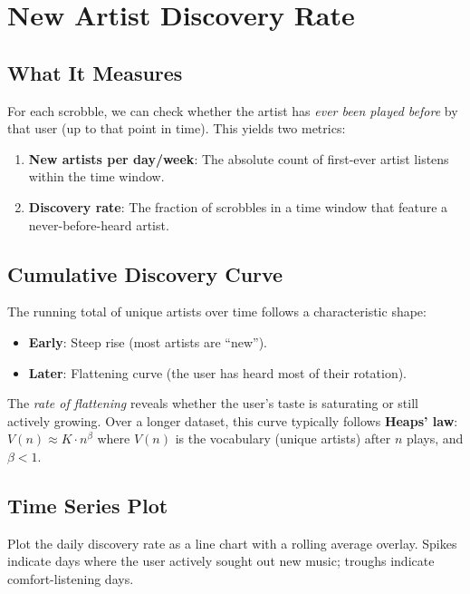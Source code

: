 \documentclass[12pt, a4paper]{article}
\begin{document}
\section{New Artist Discovery Rate}

\subsection{What It Measures}

For each scrobble, we can check whether the artist has \emph{ever been
played before} by that user (up to that point in time). This yields two
metrics:

\begin{enumerate}
    \item \textbf{New artists per day/week}: The absolute count of
          first-ever artist listens within the time window.
    \item \textbf{Discovery rate}: The fraction of scrobbles in a time
          window that feature a never-before-heard artist.
\end{enumerate}

\subsection{Cumulative Discovery Curve}

The running total of unique artists over time follows a characteristic shape:
\begin{itemize}
    \item \textbf{Early}: Steep rise (most artists are ``new'').
    \item \textbf{Later}: Flattening curve (the user has heard most of their
          rotation).
\end{itemize}

The \emph{rate of flattening} reveals whether the user's taste is saturating
or still actively growing. Over a longer dataset, this curve typically
follows \textbf{Heaps' law}: $V(n) \approx K \cdot n^\beta$ where
$V(n)$ is the vocabulary (unique artists) after $n$ plays, and $\beta < 1$.

\subsection{Time Series Plot}

Plot the daily discovery rate as a line chart with a rolling average overlay.
Spikes indicate days where the user actively sought out new music; troughs
indicate comfort-listening days.
\end{document}
